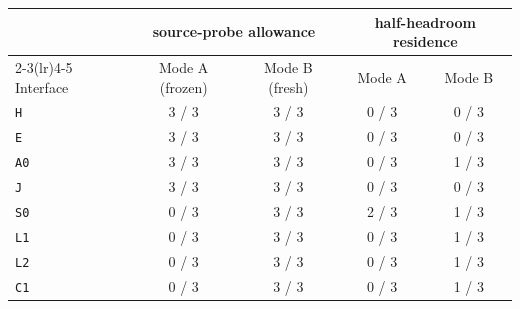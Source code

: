 \begin{tabular}{@{}lcccc@{}}
\toprule
& \multicolumn{2}{c}{source-probe allowance} & \multicolumn{2}{c}{half-headroom residence} \\[1pt]
\cmidrule(lr){2-3}\cmidrule(lr){4-5}
Interface & Mode A (frozen) & Mode B (fresh) & Mode A & Mode B \\
\midrule
\texttt{H} & 3 / 3 & 3 / 3 & 0 / 3 & 0 / 3 \\
\texttt{E} & 3 / 3 & 3 / 3 & 0 / 3 & 0 / 3 \\
\texttt{A0} & 3 / 3 & 3 / 3 & 0 / 3 & 1 / 3 \\
\texttt{J} & 3 / 3 & 3 / 3 & 0 / 3 & 0 / 3 \\
\texttt{S0} & 0 / 3 & 3 / 3 & 2 / 3 & 1 / 3 \\
\texttt{L1} & 0 / 3 & 3 / 3 & 0 / 3 & 1 / 3 \\
\texttt{L2} & 0 / 3 & 3 / 3 & 0 / 3 & 1 / 3 \\
\texttt{C1} & 0 / 3 & 3 / 3 & 0 / 3 & 1 / 3 \\
\bottomrule
\end{tabular}

